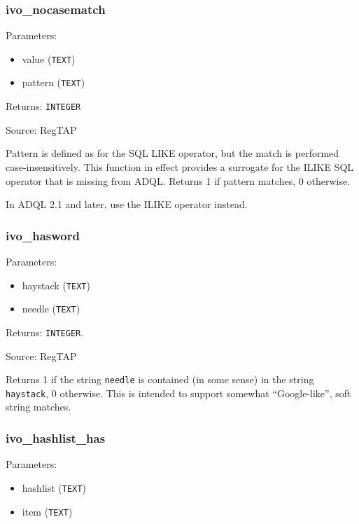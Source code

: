 \documentclass[11pt,a4paper]{ivoa}
\begin{document}
\subsubsection{ivo\_nocasematch}

Parameters:

\begin{itemize}
	\item value (\texttt{TEXT})
	\item pattern (\texttt{TEXT})
\end{itemize}

Returns: \texttt{INTEGER}

Source: RegTAP \citep{2014ivoa.spec.1208D}

Pattern is defined as for the SQL LIKE operator, but the match is
performed case-insensitively. This function in effect provides a
surrogate for the ILIKE SQL operator that is missing from ADQL. Returns
1 if pattern matches, 0 otherwise.

In ADQL 2.1 and later, use the ILIKE operator instead.

\subsubsection{ivo\_hasword}

Parameters:

\begin{itemize}
	\item haystack (\texttt{TEXT})
	\item needle (\texttt{TEXT})
\end{itemize}

Returns: \texttt{INTEGER}.

Source: RegTAP \citep{2014ivoa.spec.1208D}

Returns 1 if the string \texttt{needle} is contained (in some sense) in
the string \texttt{haystack}, 0 otherwise.  This is intended to support
somewhat ``Google-like'', soft string matches.

\subsubsection{ivo\_hashlist\_has}

Parameters:

\begin{itemize}
	\item hashlist (\texttt{TEXT})
	\item item (\texttt{TEXT})
\end{itemize}
\end{document}
